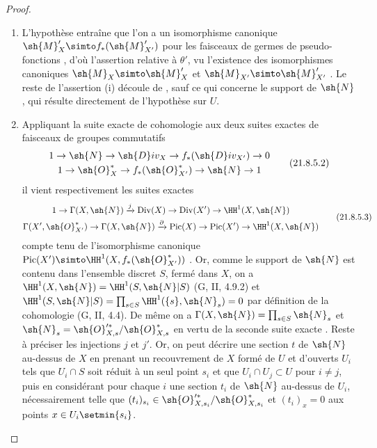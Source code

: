 \begin{proof}
\begin{enumerate}[label=(\roman*)]
  \item L'hypothèse entraîne que l'on a un isomorphisme canonique $\sh{M}'_X\simto f_*(\sh{M}'_{X'})$ pour les faisceaux de germes de pseudo-fonctions , d'où l'assertion relative à $\theta'$, vu l'existence des isomorphismes canoniques $\sh{M}_X\simto\sh{M}'_X$ et $\sh{M}_{X'}\simto\sh{M}'_{X'}$ .
Le reste de l'assertion (i) découle de , sauf ce qui concerne le support de $\sh{N}$, qui résulte directement de l'hypothèse sur $U$.

  \item Appliquant la suite exacte de cohomologie aux deux suites exactes de faisceaux de groupes commutatifs
\[
\label{IV.21.8.5.2}
\begin{gathered}
  1\to\sh{N}\to\sh{D}iv_X\to f_*(\sh{D}iv_{X'})\to0\\
  1\to\sh{O}^*_X\to f_*(\sh{O}^*_{X'})\to\sh{N}\to1
\end{gathered}
  \tag{21.8.5.2}
\]
il vient respectivement les suites exactes
\[
\label{IV.21.8.5.3}
\begin{gathered}
  1\to\Gamma(X,\sh{N})\xrightarrow{j}\operatorname{Div}(X)\to\operatorname{Div}(X')\to\HH^1(X,\sh{N})\\
  \Gamma(X',\sh{O}^*_{X'})\to\Gamma(X,\sh{N})\xrightarrow{\partial}\operatorname{Pic}(X)\to\operatorname{Pic}(X')\to\HH^1(X,\sh{N})
\end{gathered}
  \tag{21.8.5.3}
\]
compte tenu de l'isomorphisme canonique $\operatorname{Pic}(X')\simto\HH^1(X,f_*(\sh{O}^*_{X'}))$ .
Or, comme le support de $\sh{N}$ est contenu dans l'ensemble discret $S$, fermé dans $X$, on a
$\HH^1(X,\sh{N})=\HH^1(S,\sh{N}|S)$ (G, II, 4.9.2) et $\HH^1(S,\sh{N}|S)=\prod_{s\in S}\HH^1(\{s\},\sh{N}_s)=0$
par définition de la cohomologie (G, II, 4.4).
De même on a $\Gamma(X,\sh{N})=\prod_{s\in S}\sh{N}_s$ et $\sh{N}_s=\sh{O}'^{*}_{X,s}/\sh{O}^*_{X,s}$ en vertu de la seconde suite exacte .
Reste à préciser les injections $j$ et $j'$.
Or, on peut décrire une section $t$ de $\sh{N}$ au-dessus de $X$ en prenant un recouvrement de $X$ formé de $U$ et d'ouverts $U_i$ tels que $U_i\cap S$ soit réduit à un seul point $s_i$ et que $U_i\cap U_j\subset U$ pour $i\neq j$, puis en considérant pour chaque $i$ une section $t_i$ de $\sh{N}$ au-dessus de $U_i$, nécessairement telle que $(t_i)_{s_i}\in\sh{O}'^{*}_{X,s_i}/\sh{O}^*_{X,s_i}$ et $(t_i)_x=0$ aux points $x\in U_i\setmin\{s_i\}$.

\end{enumerate}
\end{proof}
